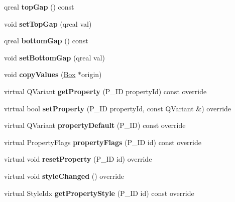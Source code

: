 \begin{DoxyCompactItemize}
qreal {\bfseries top\+Gap} () const
\item 
\mbox{\label{class_ms_1_1_box_aab3d74aef0685c3b697fa6b01e90cca6}} 
void {\bfseries set\+Top\+Gap} (qreal val)
\item 
\mbox{\label{class_ms_1_1_box_a61505cf85e9ba90249879d0392febf10}} 
qreal {\bfseries bottom\+Gap} () const
\item 
\mbox{\label{class_ms_1_1_box_a68190b31fdf0d474f4d11dfc2eb12368}} 
void {\bfseries set\+Bottom\+Gap} (qreal val)
\item 
\mbox{\label{class_ms_1_1_box_a6e4561d9ce49a81c8874b19b64dd31eb}} 
void {\bfseries copy\+Values} (\hyperlink{class_ms_1_1_box}{Box} $\ast$origin)
\item 
\mbox{\label{class_ms_1_1_box_a8e7229ac3683ae84eac2d0023c518e4b}} 
virtual Q\+Variant {\bfseries get\+Property} (P\+\_\+\+ID property\+Id) const override
\item 
\mbox{\label{class_ms_1_1_box_a53a6d0e0d7b8f0c53380d53fa88ed28e}} 
virtual bool {\bfseries set\+Property} (P\+\_\+\+ID property\+Id, const Q\+Variant \&) override
\item 
\mbox{\label{class_ms_1_1_box_a3cfbfdd20ab64dc90e1588930fefc262}} 
virtual Q\+Variant {\bfseries property\+Default} (P\+\_\+\+ID) const override
\item 
\mbox{\label{class_ms_1_1_box_aa252d8132032603d12c8c4835f2b1c3e}} 
virtual Property\+Flags {\bfseries property\+Flags} (P\+\_\+\+ID id) const override
\item 
\mbox{\label{class_ms_1_1_box_a67493803f1e25fc6031897289bd80db1}} 
virtual void {\bfseries reset\+Property} (P\+\_\+\+ID id) override
\item 
\mbox{\label{class_ms_1_1_box_a82837d01468f2a4ae7dcd7f2571a4978}} 
virtual void {\bfseries style\+Changed} () override
\item 
\mbox{\label{class_ms_1_1_box_a019f2876d0e2c47235c7b38420efd676}} 
virtual Style\+Idx {\bfseries get\+Property\+Style} (P\+\_\+\+ID id) const override
\end{DoxyCompactItemize}
